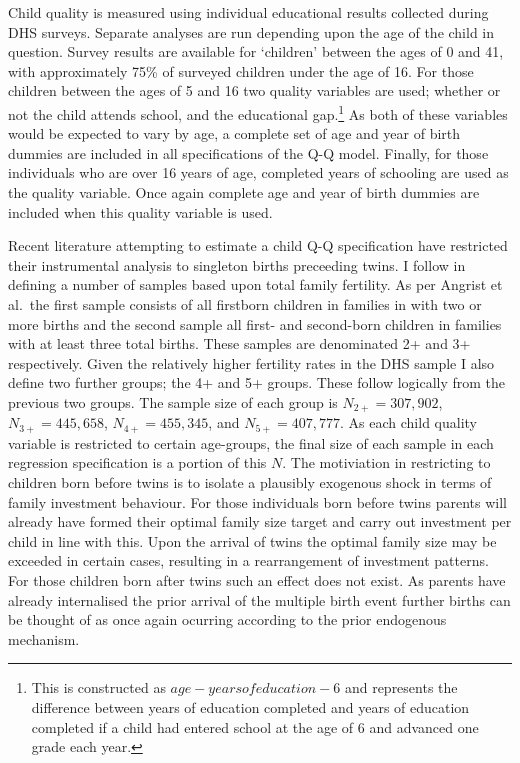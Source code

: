 \documentclass{article}[11pt,subeqn]
\begin{document}
\begin{spacing}{1.25}
Child quality is measured using individual educational results collected during DHS surveys.  Separate analyses are run depending upon the age 
of the child in question.  Survey results are available for `children' between the ages of 0 and 41, with approximately 75\% of surveyed children 
under the age of 16.  For those children between the ages of 5 and 16 two quality variables are used; whether or not the child attends school, 
and the educational gap.\footnote{This is constructed as $age-years of education - 6$ and represents the difference between years of education 
completed and years of education completed if a child had entered school at the age of 6 and advanced one grade each year.}  As both of these 
variables would be expected to vary by age, a complete set of age and year of birth dummies are included in all specifications of the Q-Q model.  
Finally, for those individuals who are over 16 years of age, completed years of schooling are used as the quality variable.  Once again complete 
age and year of birth dummies are included when this quality variable is used.

Recent literature attempting to estimate a child Q-Q specification have restricted their instrumental analysis to singleton births preceeding 
twins.  I follow \citet{Angristetal2010} in defining a number of samples based upon total family fertility.  As per Angrist et al.\ the first sample 
consists of all firstborn children in families in with two or more births and the second sample all first- and second-born children in families 
with at least three total births.  These samples are denominated 2+ and 3+ respectively.  Given the relatively higher fertility rates 
in the DHS sample I also define two further groups; the 4+ and 5+ groups.  These follow logically from the previous two groups.  The 
sample size of each group is $N_{2+}= 307,902$, $N_{3+}=445,658$, $N_{4+}= 455,345$, and $N_{5+}=407,777$.  As each child quality variable 
is restricted to certain age-groups, the final size of each sample in each regression specification is a portion of this $N$.  The motiviation 
in restricting to children born before twins is to isolate a plausibly exogenous shock in terms of family investment behaviour.  For those 
individuals born before twins parents will already have formed their optimal family size target and carry out investment per child in line 
with this.  Upon the arrival of twins the optimal family size may be exceeded in certain cases, resulting in a rearrangement of investment 
patterns.  For those children born after twins such an effect does not exist.  As parents have already internalised the prior arrival of the 
multiple birth event further births can be thought of as once again ocurring according to the prior endogenous mechanism.


\end{spacing}
\end{document}
